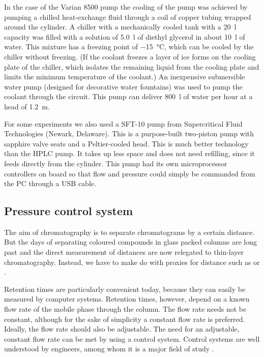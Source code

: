In the case of the Varian 8500 pump the cooling of the pump was achieved by
pumping a chilled heat-exchange fluid through a coil of copper tubing wrapped
around the cylinder. A chiller with a mechanically cooled tank with a
\SI{20}{\litre} capacity was filled with a solution of \SI{5.0}{\litre} of
diethyl glycerol in about \SI{10}{\litre} of water. This mixture has a freezing
point of \SI{-15}{\celsius}, which can be cooled by the chiller without
freezing. (If the coolant freezes a layer of ice forms on the cooling plate of
the chiller, which isolates the remaining liquid from the cooling plate and
limits the minimum temperature of the coolant.) An inexpensive submersible water
pump (designed for decorative water fountains) was used to pump the coolant
through the circuit. This pump can deliver \SI{800}{\litre} of water per hour at
a head of \SI{1.2}{\metre}.

For some experiments we also used a SFT-10 pump from Supercritical Fluid
Technologies (Newark, Delaware). This is a purpose-built two-piston pump with
sapphire valve seats and a Peltier-cooled head. This is much better technology
than the HPLC pump. It takes up less space and does not need refilling, since it
feeds directly from the cylinder. This pump had its own microprocessor
controllers on board so that flow and pressure could simply be commanded from
the PC through a USB cable.

\subsection{Pressure control system}

The aim of chromatography is to separate chromatograms by a certain distance.
But the days of separating coloured compounds in glass packed columns are long
past and the direct measurement of distances are now relegated to thin-layer
chromatography. Instead, we have to make do with proxies for distance such as
 or .



Retention times are particularly convenient today, because they can easily be
measured by computer systems. Retention times, however, depend on a known flow
rate of the mobile phase through the column. The flow rate needs not be
constant, although for the sake of simplicity a constant flow rate is preferred.
Ideally, the flow rate should also be adjustable. The need for an adjustable,
constant flow rate can be met by using a control system. Control systems are
well understood by engineers, among whom it is a major field of study
\autocite{Koenig2009}.

